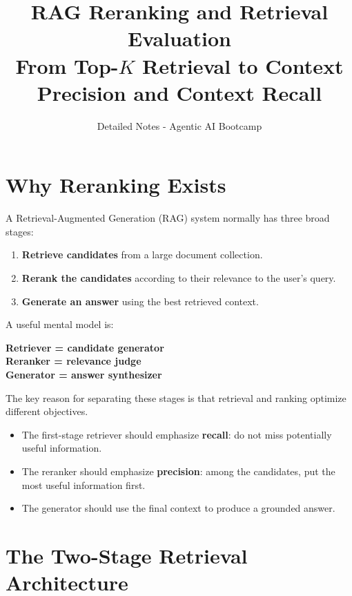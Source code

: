 \documentclass[12pt, a4paper]{article}
\title{\textbf{RAG Reranking and Retrieval Evaluation}\\
\large From Top-$K$ Retrieval to Context Precision and Context Recall}
\author{Detailed Notes - Agentic AI Bootcamp}
\date{}
\begin{document}
\maketitle
\tableofcontents
\newpage

\section{Why Reranking Exists}

A Retrieval-Augmented Generation (RAG) system normally has three broad stages:

\begin{enumerate}
    \item \textbf{Retrieve candidates} from a large document collection.
    \item \textbf{Rerank the candidates} according to their relevance to the user's query.
    \item \textbf{Generate an answer} using the best retrieved context.
\end{enumerate}

A useful mental model is:

\begin{center}
\textbf{Retriever = candidate generator}\\
\textbf{Reranker = relevance judge}\\
\textbf{Generator = answer synthesizer}
\end{center}

The key reason for separating these stages is that retrieval and ranking optimize different objectives.

\begin{itemize}
    \item The first-stage retriever should emphasize \textbf{recall}: do not miss potentially useful information.
    \item The reranker should emphasize \textbf{precision}: among the candidates, put the most useful information first.
    \item The generator should use the final context to produce a grounded answer.
\end{itemize}

\section{The Two-Stage Retrieval Architecture}
\end{document}
